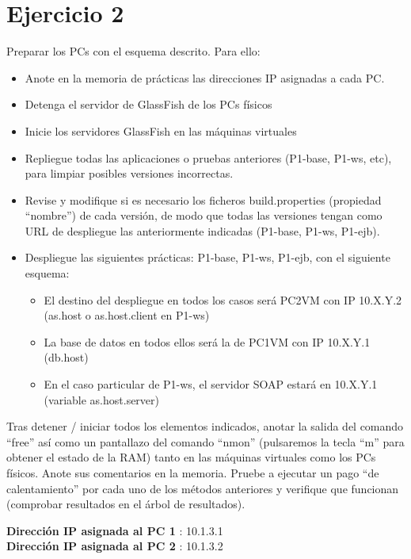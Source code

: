 \documentclass[a4paper, 10pt]{article}
\begin{document}
\section{Ejercicio 2}
\begin{mdframed} 
Preparar los PCs con el esquema descrito. Para ello:
\begin{itemize}
\item Anote en la memoria de prácticas las direcciones IP asignadas a cada PC. 
\item Detenga el servidor de GlassFish de los PCs físicos 
\item Inicie los servidores GlassFish en las máquinas virtuales 
\item Repliegue todas las aplicaciones o pruebas anteriores (P1-base, P1-ws, etc), para limpiar posibles 
versiones incorrectas. 
\item Revise y modifique si es necesario los ficheros build.properties (propiedad “nombre”) de cada 
versión, de modo que todas las versiones tengan como URL de despliegue las anteriormente 
indicadas (P1-base, P1-ws, P1-ejb). 
\item Despliegue las siguientes prácticas: P1-base, P1-ws, P1-ejb, con el siguiente esquema:
	\begin{itemize}
	\item El destino del despliegue en todos los casos será PC2VM con IP 10.X.Y.2 (as.host o 
as.host.client en P1-ws) 

	\item La base de datos en todos ellos será la de PC1VM con IP 10.X.Y.1 (db.host) 

	\item En el caso particular de P1-ws, el servidor SOAP estará en 10.X.Y.1 (variable 
as.host.server)

	\end{itemize}

\end{itemize}
Tras detener / iniciar todos los elementos indicados, anotar la salida del comando “free” así como un 
pantallazo del comando “nmon” (pulsaremos la tecla “m” para obtener el estado de la RAM) tanto en las 
máquinas virtuales como los PCs físicos. Anote sus comentarios en la memoria. 
Pruebe a ejecutar un pago “de calentamiento” por cada uno de los métodos anteriores y verifique que 
funcionan (comprobar resultados en el árbol de resultados). 
\end{mdframed}
 \textbf{Dirección IP asignada al PC 1} : 10.1.3.1 \\
 \textbf{Dirección IP asignada al PC 2} : 10.1.3.2
\end{document}
